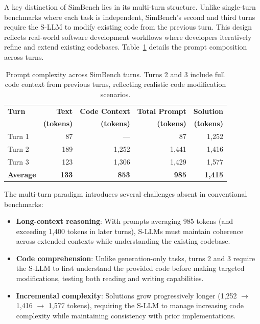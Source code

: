A key distinction of SimBench lies in its multi-turn structure. Unlike single-turn benchmarks where each task is independent, SimBench's second and third turns require the S-LLM to modify existing code from the previous turn. This design reflects real-world software development workflows where developers iteratively refine and extend existing codebases. Table~\ref{tab:turn_complexity} details the prompt composition across turns.

\begin{table}[h!]
    \centering
    \caption{Prompt complexity across SimBench turns. Turns 2 and 3 include full code context from previous turns, reflecting realistic code modification scenarios.}
    \label{tab:turn_complexity}
    \begin{tabular}{l r r r r}
        \toprule
        \textbf{Turn} & \textbf{Text} & \textbf{Code Context} & \textbf{Total Prompt} & \textbf{Solution} \\
        & \textbf{(tokens)} & \textbf{(tokens)} & \textbf{(tokens)} & \textbf{(tokens)} \\
        \midrule
        Turn 1 & 87 & --- & 87 & 1,252 \\
        Turn 2 & 189 & 1,252 & 1,441 & 1,416 \\
        Turn 3 & 123 & 1,306 & 1,429 & 1,577 \\
        \midrule
        \textbf{Average} & \textbf{133} & \textbf{853} & \textbf{985} & \textbf{1,415} \\
        \bottomrule
    \end{tabular}
\end{table}

The multi-turn paradigm introduces several challenges absent in conventional benchmarks:
\begin{itemize}
    \item \textbf{Long-context reasoning}: With prompts averaging 985 tokens (and exceeding 1,400 tokens in later turns), S-LLMs must maintain coherence across extended contexts while understanding the existing codebase.
    \item \textbf{Code comprehension}: Unlike generation-only tasks, turns 2 and 3 require the S-LLM to first understand the provided code before making targeted modifications, testing both reading and writing capabilities.
    \item \textbf{Incremental complexity}: Solutions grow progressively longer (1,252 $\rightarrow$ 1,416 $\rightarrow$ 1,577 tokens), requiring the S-LLM to manage increasing code complexity while maintaining consistency with prior implementations.
\end{itemize}

